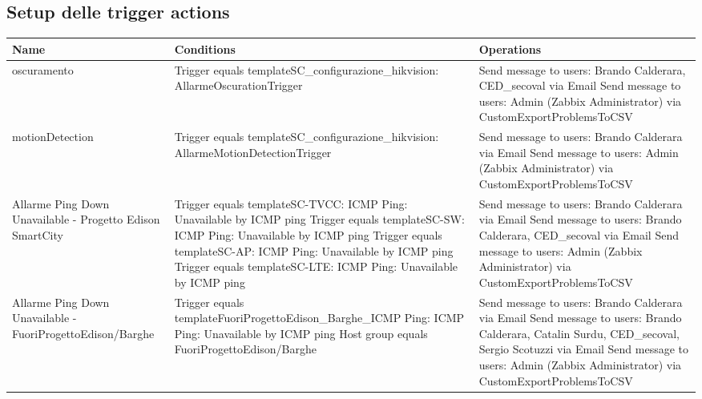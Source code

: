 \documentclass[12pt, a4paper]{report}
\begin{document}
\subsection{Setup delle trigger actions}
\begin{tabular}{|p{3cm}|p{5.25cm}|p{5.25cm}|}
\hline
\textbf{Name} & \textbf{Conditions} & \textbf{Operations} \\
\hline
oscuramento & 
Trigger equals templateSC\_configurazio\-ne\_hikvision: AllarmeOscurationTrigger & 
Send message to users: Brando Calderara, CED\_secoval via Email 
\newline
Send message to users: Admin (Zabbix Administrator) via CustomExportProblemsToCSV \\
\hline
motionDetection & 
Trigger equals templateSC\_configurazio\-ne\_hikvision: AllarmeMotionDetectionTrigger & 
Send message to users: Brando Calderara via Email 
\newline 
Send message to users: Admin (Zabbix Administrator) via CustomExportProblemsToCSV \\
\hline
Allarme Ping Down Unavailable - Progetto Edison SmartCity & 
Trigger equals templateSC-TVCC: ICMP Ping: Unavailable by ICMP ping\newline
Trigger equals templateSC-SW: ICMP Ping: Unavailable by ICMP ping\newline
Trigger equals templateSC-AP: ICMP Ping: Unavailable by ICMP ping\newline
Trigger equals templateSC-LTE: ICMP Ping: Unavailable by ICMP ping & 
Send message to users: Brando Calderara via Email 
\newline 
Send message to users: Brando Calderara, CED\_secoval via Email\newline
Send message to users: Admin (Zabbix Administrator) via CustomExportProblemsToCSV \\
\hline
Allarme Ping Down Unavailable - FuoriProgettoEdison/Barghe & 
Trigger equals templateFuoriProgettoEdison\_Barghe\_ICMP Ping: ICMP Ping: Unavailable by ICMP ping\newline
Host group equals FuoriProgettoEdison/Barghe & 
Send message to users: Brando Calderara via Email 
\newline 
Send message to users: Brando Calderara, Catalin Surdu, CED\_secoval, Sergio Scotuzzi via Email\newline
Send message to users: Admin (Zabbix Administrator) via CustomExportProblemsToCSV \\
\hline
\end{tabular}
\end{document}
